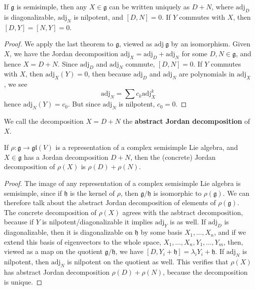 \begin{theorem}
    If $\mathfrak{g}$ is semisimple, then any $X \in \mathfrak{g}$ can be written uniquely as $D + N$, where $\text{adj}_D$ is diagonalizable, $\text{adj}_N$ is nilpotent, and $[D,N] = 0$. If $Y$ commutes with $X$, then $[D,Y] = [N,Y] = 0$.
\end{theorem}
\begin{proof}
    We apply the last theorem to $\mathfrak{g}$, viewed as $\text{adj}\ \mathfrak{g}$ by an isomorphism. Given $X$, we have the Jordan decomposition $\text{adj}_X = \text{adj}_D + \text{adj}_N$ for some $D,N \in \mathfrak{g}$, and hence $X = D + N$. Since $\text{adj}_D$ and $\text{adj}_N$ commute, $[D,N] = 0$. If $Y$ commutes with $X$, then $\text{adj}_X(Y) = 0$, then because $\text{adj}_D$ and $\text{adj}_N$ are polynomials in $\text{adj}_X$, we see
    \[ \text{adj}_N = \sum c_k \text{adj}^k_X \]
    hence $\text{adj}_N(Y) = c_0$. But since $\text{adj}_N$ is nilpotent, $c_0 = 0$.
\end{proof}

We call the decomposition $X = D + N$ the {\bf abstract Jordan decomposition} of $X$.

\begin{theorem}
    If $\rho: \mathfrak{g} \to \mathfrak{gl}(V)$ is a representation of a complex semisimple Lie algebra, and $X \in \mathfrak{g}$ has a Jordan decomposition $D + N$, then the (concrete) Jordan decomposition of $\rho(X)$ is $\rho(D) + \rho(N)$.
\end{theorem}
\begin{proof}
    The image of any representation of a complex semisimple Lie algebra is semisimple, since if $\mathfrak{h}$ is the kernel of $\rho$, then $\mathfrak{g}/\mathfrak{h}$ is isomorphic to $\rho(\mathfrak{g})$. We can therefore talk about the abstract Jordan decomposition of elements of $\rho(\mathfrak{g})$. The concrete decomposition of $\rho(X)$ agrees with the asbtract decomposition, because if $Y$ is nilpotent/diagonalizable it implies $\text{adj}_Y$ is as well. If $\text{adj}_D$ is diagonalizable, then it is diagonalizable on $\mathfrak{h}$ by some basis $X_1, \dots, X_n$, and if we extend this basis of eigenvectors to the whole space, $X_1, \dots, X_n, Y_1, \dots, Y_m$, then, viewed as a map on the quotient $\mathfrak{g}/\mathfrak{h}$, we have $[D, Y_i + \mathfrak{h}] = \lambda_i Y_i + \mathfrak{h}$. If $\text{adj}_N$ is nilpotent, then $\text{adj}_N$ is nilpotent on the quotient as well. This verifies that $\rho(X)$ has abstract Jordan decomposition $\rho(D) + \rho(N)$, because the decomposition is unique.
\end{proof}








